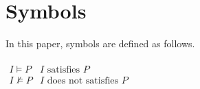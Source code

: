\section*{Symbols}
In this paper, symbols are defined as follows. \\ \ \\ 
$
\begin{array}{cl}
	I\models P & \text{$I$ satisfies $P$} \\
	I\not\models P & \text{$I$ does not satisfies $P$} \\
\end{array}
$